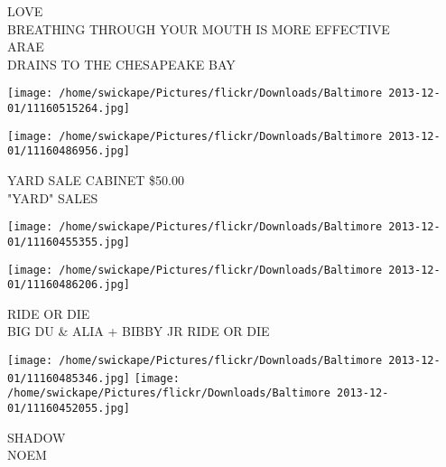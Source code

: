 \documentclass[10pt,letterpaper]{article}
\begin{document}
LOVE\\
BREATHING THROUGH YOUR MOUTH IS MORE EFFECTIVE\\
ARAE\\
DRAINS TO THE CHESAPEAKE BAY
\pagebreak

\texttt{[image: /home/swickape/Pictures/flickr/Downloads/Baltimore 2013-12-01/11160515264.jpg]}

\vspace{0.25in}
\texttt{[image: /home/swickape/Pictures/flickr/Downloads/Baltimore 2013-12-01/11160486956.jpg]}

YARD SALE CABINET \$50.00\\
"YARD" SALES
\pagebreak

\texttt{[image: /home/swickape/Pictures/flickr/Downloads/Baltimore 2013-12-01/11160455355.jpg]}

\vspace{0.25in}
\texttt{[image: /home/swickape/Pictures/flickr/Downloads/Baltimore 2013-12-01/11160486206.jpg]}

RIDE OR DIE\\
BIG DU \& ALIA + BIBBY JR RIDE OR DIE
\pagebreak

\texttt{[image: /home/swickape/Pictures/flickr/Downloads/Baltimore 2013-12-01/11160485346.jpg]}
\texttt{[image: /home/swickape/Pictures/flickr/Downloads/Baltimore 2013-12-01/11160452055.jpg]}

SHADOW\\
NOEM
\pagebreak
\end{document}
